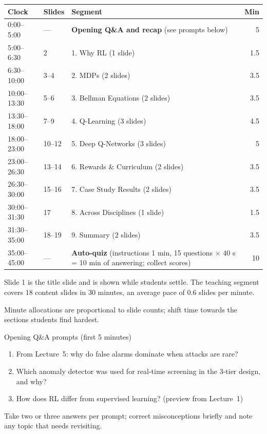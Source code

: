 \documentclass[11pt]{article}
\begin{document}
\begin{center}\small\renewcommand{\arraystretch}{1.2}\begin{tabularx}{\textwidth}{@{}l l X r@{}}\toprule\textbf{Clock} & \textbf{Slides} & \textbf{Segment} & \textbf{Min}\\\midrule

0:00--5:00 & --- & \textbf{Opening Q\&A and recap} (see prompts below) & 5\\

5:00--6:30 & 2 & 1. Why RL (1 slide) & 1.5\\

6:30--10:00 & 3--4 & 2. MDPs (2 slides) & 3.5\\

10:00--13:30 & 5--6 & 3. Bellman Equations (2 slides) & 3.5\\

13:30--18:00 & 7--9 & 4. Q-Learning (3 slides) & 4.5\\

18:00--23:00 & 10--12 & 5. Deep Q-Networks (3 slides) & 5\\

23:00--26:30 & 13--14 & 6. Rewards \& Curriculum (2 slides) & 3.5\\

26:30--30:00 & 15--16 & 7. Case Study Results (2 slides) & 3.5\\

30:00--31:30 & 17 & 8. Across Disciplines (1 slide) & 1.5\\

31:30--35:00 & 18--19 & 9. Summary (2 slides) & 3.5\\

35:00--45:00 & --- & \textbf{Auto-quiz} (instructions 1 min, 15 questions $\times$ 40 s = 10 min of answering; collect scores) & 10\\\bottomrule\end{tabularx}\end{center}

Slide 1 is the title slide and is shown while students settle. The teaching segment covers 18 content slides in 30 minutes, an average pace of 0.6 slides per minute. 

Minute allocations are proportional to slide counts; shift time towards the sections students find hardest.

\begin{instr}{Opening Q\&A prompts (first 5 minutes)}\begin{enumerate}\item From Lecture~5: why do false alarms dominate when attacks are rare?\item Which anomaly detector was used for real-time screening in the 3-tier design, and why?\item How does RL differ from supervised learning? (preview from Lecture~1)\end{enumerate}Take two or three answers per prompt; correct misconceptions briefly and note any topic that needs revisiting.\end{instr}
\end{document}
